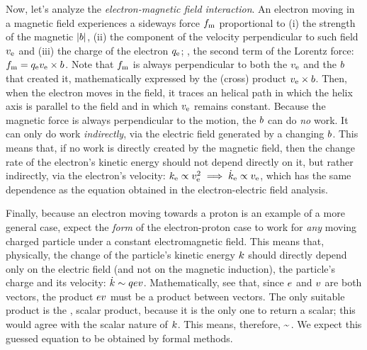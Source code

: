 Now, let's analyze the \emph{electron-magnetic field interaction}. An electron moving in a magnetic field experiences a sideways force $f_\text{m}$ proportional to (i) the strength of the magnetic  $\vert{b}\vert$, (ii) the component of the velocity perpendicular to such field $v_\text{e}$ and (iii) the charge of the electron $q_\text{e}$; \ie, the second term of the Lorentz force: $f_\text{m} = q_\text{e}v_\text{e}\times b$. Note that $f_\text{m}$ is always perpendicular to both the $v_\text{e}$ and the $b$ that created it, mathematically expressed by the (cross) product $v_\text{e}\times b$. Then, when the electron moves in the field, it traces an helical path in which the helix axis is parallel to the field and in which $v_\text{e}$ remains constant. Because the magnetic force is always perpendicular to the motion, the $b$ can do \emph{no} work. It can only do work \emph{indirectly}, via the electric field generated by a changing $b$. This means that, if no work is directly created by the magnetic field, then the change rate of the electron's kinetic energy should not depend directly on it, but rather indirectly, via the electron's velocity: $k_\text{e}\propto v_\text{e}^2\implies\dot{k}_\text{e}\propto v_\text{e}$, which has the same dependence as the equation obtained in the electron-electric field analysis.

Finally, because an electron moving towards a proton is an example of a more general case, expect the \emph{form} of the electron-proton case to work for \emph{any} moving charged particle under a constant electromagnetic field. This means that, physically, the change of the particle's kinetic energy $k$ should directly depend only on the electric field (and not on the magnetic induction), the particle's charge and its velocity: $\dot{k}\sim qev$. Mathematically, see that, since $e$ and $v$ are both vectors, the product $ev$ must be a product between vectors. The only suitable product is the , \aka scalar product, because it is the only one to return a scalar; this would agree with the scalar nature of $k$. This means, therefore,
%
\beq
  \dt\ekin \sim \echarge\efield\iprod\vel\,.
\eeq
%
We expect this guessed equation to be obtained by formal methods.


